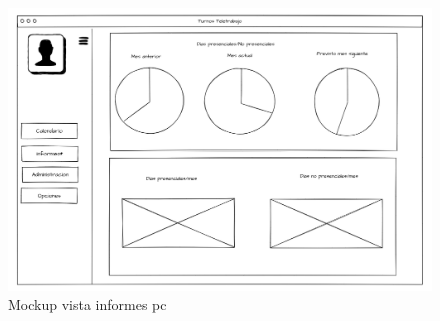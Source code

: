 \documentclass[11pt,spanish,listoffigures,listoftables]{tfgetsinf}
\begin{document}
 \begin{figure}[h!] %
   \includegraphics[width=\linewidth]{img/Vista_Informes_PC.png}
   \caption{Mockup vista informes pc}
   \label{fig:informesPC}
 \end{figure}
\end{document}
